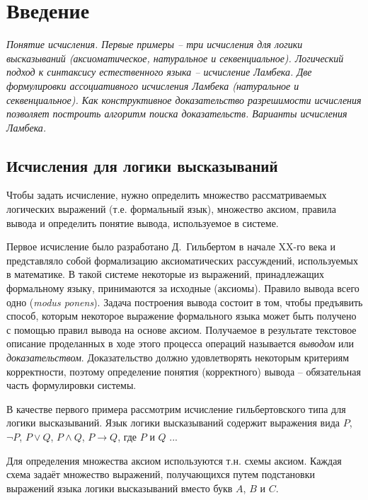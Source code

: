 \chapter{Введение}

\textit{Понятие исчисления. Первые примеры -- три исчисления для логики высказываний (аксиоматическое, натуральное и секвенциальное). Логический подход к синтаксису естественного языка -- исчисление Ламбека. Две формулировки ассоциативного исчисления Ламбека (натуральное и секвенциальное). Как конструктивное доказательство разрешимости исчисления позволяет построить алгоритм поиска доказательств. Варианты исчисления Ламбека.}

\section{Исчисления для логики высказываний}

Чтобы задать исчисление, нужно определить множество рассматриваемых логических выражений (т.е. формальный язык), множество аксиом, правила вывода и определить понятие вывода, используемое в системе. 

Первое исчисление было разработано Д.~Гильбертом в начале XX-го века и представляло собой формализацию аксиоматических рассуждений, используемых в математике. В такой системе некоторые из выражений, принадлежащих формальному языку, принимаются за исходные (аксиомы). Правило вывода всего одно (\textit{modus ponens}). Задача построения вывода состоит в том, чтобы предъявить способ, которым некоторое выражение формального языка может быть получено с помощью правил вывода на основе аксиом. Получаемое в результате текстовое описание проделанных в ходе этого процесса операций называется \textit{выводом} или \textit{доказательством}. Доказательство должно удовлетворять некоторым критериям корректности, поэтому определение понятия (корректного) вывода -- обязательная часть формулировки системы. 

В качестве первого примера рассмотрим исчисление гильбертовского типа для логики высказываний. Язык логики высказываний содержит выражения вида $P$, $\neg P$, $P \vee Q$, $P \wedge Q$, $P \to Q$, где $P$ и $Q$ ...

Для определения множества аксиом используются т.н. схемы аксиом. Каждая схема задаёт множество выражений, получающихся путем подстановки выражений языка логики высказываний вместо букв $A$, $B$ и $C$.

